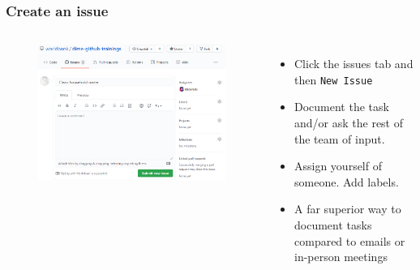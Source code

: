 \documentclass[aspectratio=169]{beamer} %
\begin{document}
\begin{frame}
	\frametitle{Create an issue}
	\begin{columns}[c]

		\vspace{-.5cm}
		\begin{figure}
			\centering
			\includegraphics[width=\textwidth]{./img/create-issue.png}
		\end{figure}
		
		
		\begin{itemize}
			\setlength\itemsep{.5em}
			\item Click the issues tab and then \texttt{New Issue}
			\item Document the task and/or ask the rest of the team of input.
			\item Assign yourself of someone. Add labels.
			\item A far superior way to document tasks compared to emails or in-person meetings
		\end{itemize}
			
	\end{columns}	
\end{frame}
\end{document}
